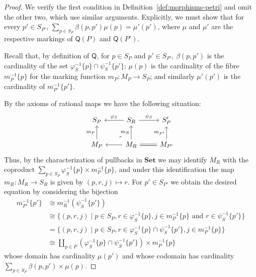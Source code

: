 \documentclass[10pt,a4paper]{amsart}
\newcommand{\Q}{\mathsf{Q}}
\begin{document}
\begin{proof}
We verify the first condition in  Definition~\ref{def:morphisms-petri} and omit the other two, which use similar arguments. Explicitly, we must show that for every $p' \in S_{P'}$, $\sum_{p \in S_P} \beta(p, p')\mu(p) = \mu'(p')$, where $\mu$ and $\mu'$ are the respective markings of $\Q(P)$ and $\Q(P')$. 

Recall that, by definition of $\Q$, for $p \in S_P$ and $p' \in S_{P'}$, $\beta(p, p')$ is the cardinality of the set $\varphi_S^{-1}\{p\} \cap \psi_S^{-1}\{p'\}$; $\mu(p)$ is the cardinality of the fibre $m_P^{-1}\{ p\}$ for the marking function $m_P : M_P \to S_P$; and similarly $\mu'(p')$ is the cardinality of $m_{P'}^{-1}\{p'\}$. 

By the axioms of rational maps we have the following situation:
\[
\begin{tikzcd}
	S_P & S_R & S_P' \\
	M_P & {M_R} & {M_{P'}} 
	\arrow[from=1-2, to=1-1, "\varphi_S"']
	\arrow[from=1-2, to=1-3, "\psi_S"]
	\arrow[from=2-1, to=1-1, "m_P"]
	\arrow["\lrcorner"{anchor=center, pos=0.125, rotate=180}, draw=none, from=2-2, to=1-1]
	\arrow[from=2-2, to=1-2, "m_R"]
	\arrow[from=2-2, to=2-1]
	\arrow[equals, from=2-2, to=2-3]
	\arrow[from=2-3, to=1-3, "m_{P'}"]
\end{tikzcd}
\]
Thus, by the characterization of pullbacks in $\mathbf{Set}$ we may identify $M_R$ with the coproduct $\sum_{p \in S_P} \varphi_S^{-1}\{p\} \times m_P^{-1}\{p \}$, and under this identification the map $m_R : M_R \to S_R$ is given by $(p, r, j) \mapsto r$. For $p' \in S_{P'}$ we obtain the desired equation by considering the bijection 
\begin{align*}
m_{P'}^{-1}\{p'\} &\cong m_R^{-1} \left( \psi_S^{-1} \{ p' \} \right) \\
&\cong \{ (p, r, j) \mid  p \in S_P, r \in \varphi_S^{-1}\{p \}, j \in m_P^{-1}\{p\} \text{ and } r \in \psi_S^{-1} \{p'\} \} \\ 
&= \{ (p, r, j) \mid  p \in S_P, r \in \varphi_S^{-1}\{p \} \cap \psi_S^{-1}\{p'\}, j \in m_P^{-1}\{p\} \} \\ 
&\cong \coprod_{p \in P} \left(\varphi_S^{-1}\{p \} \cap \psi_S^{-1}\{p'\}\right) \times m_P^{-1}\{p\}
\end{align*}
whose domain has cardinality $\mu(p')$ and whose codomain has cardinality $\sum_{p \in S_P} \beta(p, p') \times \mu(p)$.





\end{proof}
\end{document}
